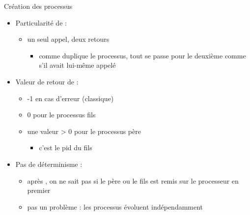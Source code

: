\begin {frame} {Création des processus}
    \begin {itemize}
	\item Particularité de  :
	    \begin {itemize}
		\item un seul appel, deux retours
		    \begin {itemize}
			\item comme  duplique le processus,
			    tout se passe pour le deuxième comme s'il
			    avait lui-même appelé 
		    \end {itemize}

	    \end {itemize}
	\item Valeur de retour de  :
	    \begin {itemize}
		\item -1 en cas d'erreur (classique)
		\item 0 pour le processus fils
		\item une valeur > 0 pour le processus père
		    \begin {itemize}
			\item c'est le pid du fils
		    \end {itemize}
	    \end {itemize}
	\item Pas de déterminisme :
	    \begin {itemize}
		\item après , on ne sait pas si le père ou
		    le fils est remis sur le processeur en premier
		\item pas un problème : les processus évoluent indépendamment
	    \end {itemize}
    \end {itemize}
\end {frame}

